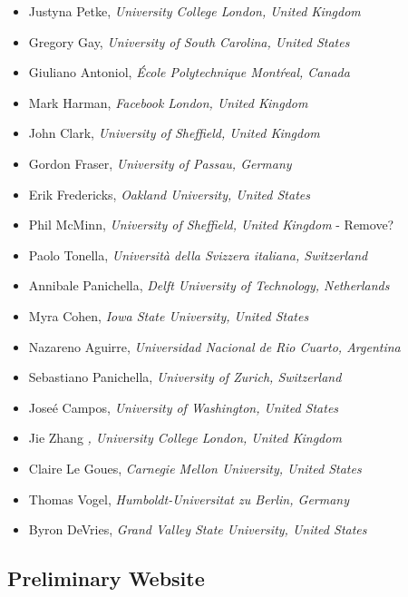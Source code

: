 \documentclass[sigconf,review]{acmart}
\begin{document}
{\small
\begin{itemize}[leftmargin=*]\setlength{\itemsep}{0cm}
\item Justyna Petke, {\it University College London, United Kingdom}
\item Gregory Gay, {\it University of South Carolina, United States}
\item Giuliano Antoniol, {\it \'Ecole Polytechnique Mont\'real, Canada}
\item Mark Harman, {\it Facebook London, United Kingdom}
\item John Clark, {\it University of Sheffield, United Kingdom}
\item Gordon Fraser, {\it University of Passau, Germany}
\item Erik Fredericks, {\it Oakland University, United States}
\item Phil McMinn, {\it University of Sheffield, United Kingdom} - Remove?
\item Paolo Tonella, {\it Universit\`a della Svizzera italiana, Switzerland}
\item Annibale Panichella, {\it Delft University of Technology, Netherlands}
\item Myra Cohen, {\it Iowa State University, United States}
\item Nazareno Aguirre, {\it Universidad Nacional de Rio Cuarto, Argentina}
\item Sebastiano Panichella, {\it University of Zurich, Switzerland}
\item Jose\'e Campos, {\it University of Washington, United States}
\item Jie Zhang {\it, University College London, United Kingdom}
\item Claire Le Goues, {\it Carnegie Mellon University, United States}
\item Thomas Vogel, {\it Humboldt-Universitat zu Berlin, Germany}
\item Byron DeVries, {\it Grand Valley State University, United States}
\end{itemize}
}
 
\subsection{Preliminary Website}
\end{document}

